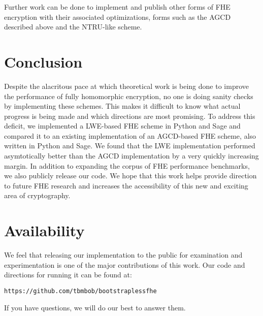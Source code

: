 \documentclass[letterpaper,twocolumn,10pt]{article}
\begin{document}
Further work can be done to implement and publish other forms of FHE encryption with their associated optimizations, forms such as the AGCD described above and the NTRU-like scheme.



\section{Conclusion}
Despite the alacritous pace at which theoretical work is being done to improve the performance of fully homomorphic encryption, no one is doing sanity checks by implementing these schemes. This makes it difficult to know what actual progress is being made and which directions are most promising. To address this deficit, we implemented a LWE-based FHE scheme in Python and Sage and compared it to an existing implementation of an AGCD-based FHE scheme, also written in Python and Sage. We found that the LWE implementation performed asymtotically better than the AGCD implementation by a very quickly increasing margin. In addition to expanding the corpus of FHE performance benchmarks, we also publicly release our code. We hope that this work helps provide direction to future FHE research and increases the accessibility of this new and exciting area of cryptography.


\section{Availability}
We feel that releasing our implementation to the public for examination and experimentation is one of the major contributions of this work. Our code and directions for running it can be found at:

\begin{center}
{\tt https://github.com/tbmbob/bootstraplessfhe}\\
\end{center}

If you have questions, we will do our best to answer them.
\end{document}
